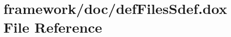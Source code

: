 \hypertarget{def_files_sdef_8dox}{}\section{framework/doc/def\+Files\+Sdef.dox File Reference}
\label{def_files_sdef_8dox}
